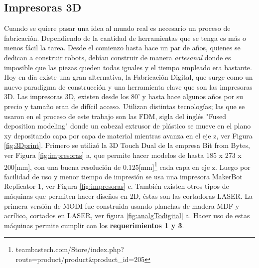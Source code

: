 \subsection{Impresoras 3D}
Cuando se quiere pasar una idea al mundo real es necesario un proceso de fabricación. Dependiendo de la cantidad de herramientas que se tenga es más o menos fácil la tarea. Desde el comienzo hasta hace un par de años, quienes se dedican a construir robots, debían construir de manera \textit{artesanal} donde es imposible que las piezas queden todas iguales y el tiempo empleado era bastante. Hoy en día existe una gran alternativa, la Fabricación Digital, que surge como un nuevo paradigma de construcción y una herramienta clave que son las impresoras 3D. Las impresoras 3D, existen desde los 80' y hasta hace algunos años por su precio y tamaño eran de difícil acceso. Utilizan distintas tecnologías; las que se usaron en el proceso de este trabajo son las FDM, sigla del inglés "Fused deposition modeling" donde un cabezal extrusor de plástico se mueve en el plano xy depositando capa por capa de material mientras avanza en el eje z, ver Figura \ref{fig:3Dprint}. Primero se utilizó la 3D Touch Dual de la empresa Bit from Bytes, ver Figura \ref{fig:impresoras} a, que permite hacer modelos de hasta 185 x 273 x 200[mm], con una buena resolución de 0.125[mm]\footnote{teambastech.com/Store/index.php?route=product/product\&product\_id=205} cada capa en eje z. Luego por facilidad de uso y menor tiempo de impresión se usa una impresora MakerBot Replicator 1, ver Figura \ref{fig:impresoras} c. También existen otros tipos de máquinas que permiten hacer diseños en 2D, éstas son las cortadoras LASER. La primera versión de MODI fue construida usando planchas de madera MDF y acrílico, cortados en LASER, ver figura \ref{fig:analgTodigital} a. Hacer uso de estas máquinas permite cumplir con los \textbf{requerimientos 1 y 3}.

